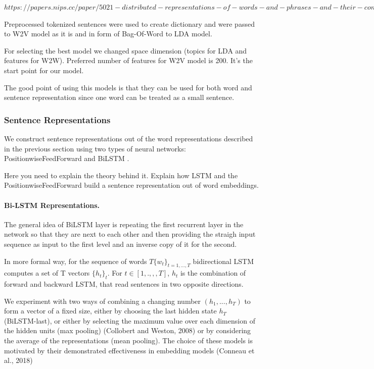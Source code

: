 \documentclass[11pt]{article}
\begin{document}
$https://papers.nips.cc/paper/5021-distributed-representations-of-words-and-phrases-and-their-compositionality.pdf$


Preprocessed tokenized sentences were used to create dictionary and were passed to W2V model as it is and in form of Bag-Of-Word to LDA model.

For selecting the best model we changed space dimension (topics for LDA and features for W2W). Preferred number of features for W2V model is 200. It's the start point for our model.

The good point of using this models is that they can be used for both word and sentence representation since one word can be treated as a small sentence.


\subsubsection{Sentence Representations}

We construct sentence representations out of the word representations described in the previous section using two types of neural networks:  PositionwiseFeedForward \cite{vaswani2017attention} and BiLSTM .

Here you need to explain the theory behind it. Explain how LSTM and the PositionwiseFeedForward  build a sentence representation out of word embeddings.

\paragraph{Bi-LSTM Representations.} 
The general idea of BiLSTM layer is repeating the first recurrent layer in the network so that they are next to each other and then providing the straigh input sequence as input to the first level and an inverse copy of it for the second.

In more formal way, for the sequence of words $T \{w_{t}\}_{t = 1, ..., T}$ bidirectional LSTM computes a set of T vectors $\{h_{t}\}_{t}$. For $t ∈ [1 ,. ,,, T]$, $h_{t}$ is the combination of forward and backward LSTM, that read sentences in two opposite directions. 

We experiment with two ways of combining a changing number $(h_{1}, ..., h_{T})$ to form a vector of a fixed size, either by choosing the last hidden state $h_{T}$ (BiLSTM-last), or either by selecting the maximum value over each dimension of the hidden units (max pooling) (Collobert and Weston, 2008) or by considering the average of the representations (mean pooling). The choice of these models is motivated by their demonstrated effectiveness in embedding models (Conneau et al., 2018) 
\end{document}
